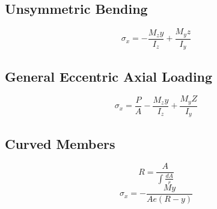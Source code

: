 \documentclass[10pt,landscape]{article}
\begin{document}
\begin{multicols}{3}
\subsection{Unsymmetric Bending}
\begin{equation}
    \sigma_x=-\frac{M_zy}{I_z}+\frac{M_yz}{I_y}
\end{equation}
\subsection{General Eccentric Axial Loading}
\begin{equation}
    \sigma_x=\frac{P}{A}-\frac{M_zy}{I_z}+\frac{M_yZ}{I_y}
\end{equation}
\subsection{Curved Members}
\begin{equation}
    R=\frac{A}{\int\frac{dA}{r}}
\end{equation}
\begin{equation}
    \sigma_x=-\frac{My}{Ae(R-y)}
\end{equation}

\end{multicols}
\end{document}
